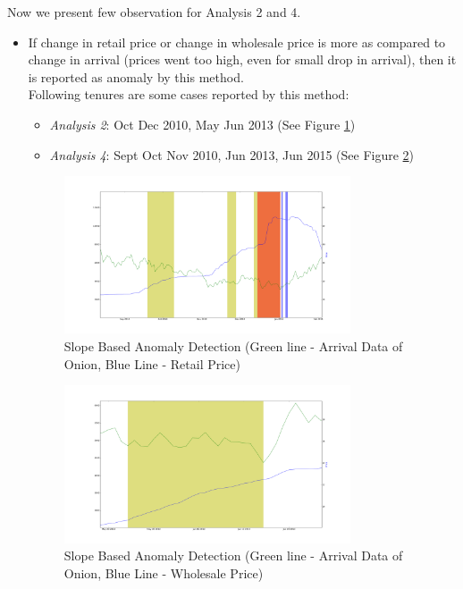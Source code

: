 		
		Now we present few observation for Analysis 2 and 4.
		
		\begin{itemize}
			\item If change in retail price or change in wholesale price is more as compared to change in arrival (prices went too high, even for small drop in arrival), then it is reported as anomaly by this method.\\
			
			Following tenures are some cases reported by this method:
			\begin{itemize}
				\item \textit{Analysis 2}: Oct Dec 2010, May Jun 2013 (See Figure \ref{fig:12121})
				\item \textit{Analysis 4}: Sept Oct Nov 2010, Jun 2013, Jun 2015 (See Figure \ref{fig:12141})
			\end{itemize}	
			
			\begin{figure}[H]
		    	\centering
  		    	\includegraphics[width=0.8\textwidth]{graphs/12121.png}
		    	\caption{Slope Based Anomaly Detection (Green line - Arrival Data of Onion, Blue Line - Retail Price)}
		    	\label{fig:12121}
			\end{figure}
			
			\begin{figure}[H]
		    	\centering
  		    	\includegraphics[width=0.8\textwidth]{graphs/12141.png}
		    	\caption{Slope Based Anomaly Detection (Green line - Arrival Data of Onion, Blue Line - Wholesale Price)}
		    	\label{fig:12141}
			\end{figure}
			

\end{itemize}
